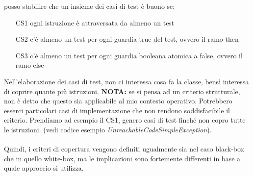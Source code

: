 \documentclass{article}
\begin{document}
posso stabilire che un insieme dei casi di test è buono se:
\begin{itemize}
\item[CS1] ogni istruzione è attraversata da almeno un test
\item[CS2] c'è almeno un test per ogni guardia true del test, ovvero il ramo then
\item[CS3] c'è almeno un test per ogni guardia booleana atomica a false, ovvero il ramo else
\end{itemize}
Nell'elaborazione dei casi di test, non ci interessa cosa fa la classe, bensì interessa di coprire quante più istruzioni. \textbf{NOTA: }se si pensa ad un criterio strutturale, non è detto che questo sia applicabile al mio contesto operativo. Potrebbero esserci particolari casi di implementazione che non rendono soddisfacibile il criterio. Prendiamo ad esempio il CS1, genero casi di test finché non copro tutte le istruzioni. (vedi codice esempio \textit{UnreachableCodeSimpleException}).\\\\ Quindi, i criteri di copertura vengono definiti ugualmente sia nel caso black-box che in quello white-box, ma le implicazioni sono fortemente differenti in base a quale approccio si utilizza.
\end{document}
